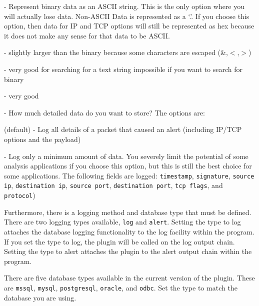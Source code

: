 \documentclass[english]{report}
\begin{document}
\begin{description}{}
\begin{description}{}
      \item [\texttt{ascii}] - Represent binary data as an ASCII string. This is
      the only option where you will actually lose data. Non-ASCII
      Data is represented as a `.'. If you choose this option, then data
      for IP and TCP options will still be represented as hex because
      it does not make any sense for that data to be ASCII.

\begin{description}{}
\item [Storage~requirements]- slightly larger than the binary because
some characters are escaped (\&,$<$,$>$)
\item [Searchability]- very good for searching for a text string impossible
if you want to search for binary 
\item [human~readability]- very good
\end{description}
\end{description}
\item [\texttt{detail}] - How much detailed data do you want to store? The options
are:

\begin{description}{}
\item [\texttt{full}](default) - Log all details of a packet that caused an alert
(including IP/TCP options and the payload)
\item [\texttt{fast}] - Log only a minimum amount of data. You severely limit the potential
of some analysis applications if you choose this option, but this
is still the best choice for some applications. The following fields
are logged: \texttt{timestamp}, \texttt{signature}, \texttt{source ip}, \texttt{destination ip}, \texttt{source
port}, \texttt{destination port}, \texttt{tcp flags}, and \texttt{protocol})
\end{description}
\end{description}
Furthermore, there is a logging method and database type that must
be defined. There are two logging types available, \texttt{log} and \texttt{alert}.
Setting the type to log attaches the database logging functionality
to the log facility within the program. If you set the type to log,
the plugin will be called on the log output chain. Setting the type
to alert attaches the plugin to the alert output chain within the
program.

There are five database types available in the current version of the plugin.
These are \texttt{mssql}, \texttt{mysql}, \texttt{postgresql}, \texttt{oracle}, and \texttt{odbc}.  
Set the type to match
the database you are using.
\end{document}
